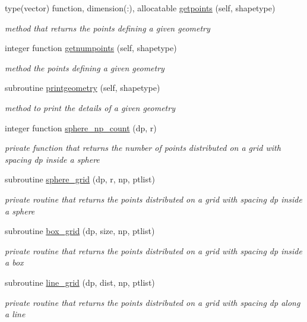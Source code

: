 \begin{DoxyCompactItemize}
type(vector) function, dimension(\+:), allocatable \mbox{\hyperlink{namespacegeometry__mod_a0b1a3c5aa414292ace34d59487082e3a}{getpoints}} (self, shapetype)
\begin{DoxyCompactList}\small\item\em method that returns the points defining a given geometry \end{DoxyCompactList}\item 
integer function \mbox{\hyperlink{namespacegeometry__mod_a524c5d28a80fb6729b102126485605ce}{getnumpoints}} (self, shapetype)
\begin{DoxyCompactList}\small\item\em method the points defining a given geometry \end{DoxyCompactList}\item 
subroutine \mbox{\hyperlink{namespacegeometry__mod_aed4426181ca851b41717edd50268e5f3}{printgeometry}} (self, shapetype)
\begin{DoxyCompactList}\small\item\em method to print the details of a given geometry \end{DoxyCompactList}\item 
integer function \mbox{\hyperlink{namespacegeometry__mod_a05de7940b4e7df5a2b31f3d0414e3743}{sphere\+\_\+np\+\_\+count}} (dp, r)
\begin{DoxyCompactList}\small\item\em private function that returns the number of points distributed on a grid with spacing dp inside a sphere \end{DoxyCompactList}\item 
subroutine \mbox{\hyperlink{namespacegeometry__mod_a6c03a4ea3de6763940396dbeb3908ebc}{sphere\+\_\+grid}} (dp, r, np, ptlist)
\begin{DoxyCompactList}\small\item\em private routine that returns the points distributed on a grid with spacing dp inside a sphere \end{DoxyCompactList}\item 
subroutine \mbox{\hyperlink{namespacegeometry__mod_ae87e4ecff2d21a839da2b82919b5fd0b}{box\+\_\+grid}} (dp, size, np, ptlist)
\begin{DoxyCompactList}\small\item\em private routine that returns the points distributed on a grid with spacing dp inside a box \end{DoxyCompactList}\item 
subroutine \mbox{\hyperlink{namespacegeometry__mod_abcb09c0f5274c27cb79b0dd009ed94b3}{line\+\_\+grid}} (dp, dist, np, ptlist)
\begin{DoxyCompactList}\small\item\em private routine that returns the points distributed on a grid with spacing dp along a line \end{DoxyCompactList}\end{DoxyCompactItemize}
